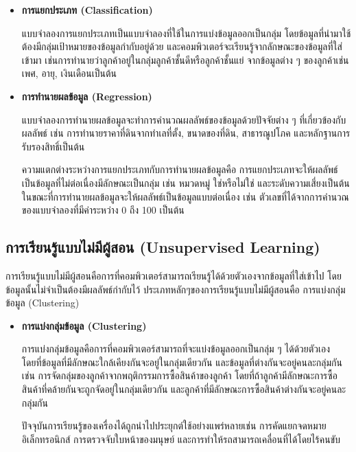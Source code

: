 \begin{itemize}
    \item\textbf{การแยกประเภท (Classification)}\par
    แบบจำลองการแยกประเภทเป็นแบบจำลองที่ใช้ในการแบ่งข้อมูลออกเป็นกลุ่ม 
    โดยข้อมูลที่นำมาใช้ต้องมีกลุ่มเป้าหมายของข้อมูลกำกับอยู่ด้วย 
    และคอมพิวเตอร์จะเรียนรู้จากลักษณะของข้อมูลที่ใส่เข้ามา 
    เช่นการทำนายว่าลูกค้าอยู่ในกลุ่มลูกค้าชั้นดีหรือลูกค้าชั้นแย่ จากข้อมูลต่าง ๆ ของลูกค้าเช่น เพศ, อายุ, เงินเดือนเป็นต้น

    \item\textbf{การทำนายผลข้อมูล (Regression)}\par
    แบบจำลองการทำนายผลข้อมูลจะทำการคำนวณผลลัพธ์ของข้อมูลด้วยปัจจัยต่าง ๆ ที่เกี่ยวข้องกับผลลัพธ์ 
    เช่น การทำนายราคาที่ดินจากทำเลที่ตั้ง, ขนาดของที่ดิน, สาธารณูปโภค 
    และหลักฐานการรับรองสิทธิ์เป็นต้น\par
    ความแตกต่างระหว่างการแยกประเภทกับการทำนายผลข้อมูลคือ 
    การแยกประเภทจะให้ผลลัพธ์เป็นข้อมูลที่ไม่ต่อเนื่องมีลักษณะเป็นกลุ่ม 
    เช่น หมวดหมู่ ใช่หรือไม่ใช่ และระดับความเสี่ยงเป็นต้น ในขณะที่การทำนายผลข้อมูลจะให้ผลลัพธ์เป็นข้อมูลแบบต่อเนื่อง เช่น 
    ตัวเลขที่ได้จากการคำนวณของแบบจำลองที่มีค่าระหว่าง 0 ถึง 100 เป็นต้น
\end{itemize}

\subsection{การเรียนรู้แบบไม่มีผู้สอน (Unsupervised Learning)}
การเรียนรู้แบบไม่มีผู้สอนคือการที่คอมพิวเตอร์สามารถเรียนรู้ได้ด้วยตัวเองจากข้อมูลที่ใส่เข้าไป 
โดยข้อมูลนั้นไม่จำเป็นต้องมีผลลัพธ์กำกับไว้ ประเภทหลักๆของการเรียนรู้แบบไม่มีผู้สอนคือ การแบ่งกลุ่มข้อมูล (Clustering)

\begin{itemize}
    \item\textbf{การแบ่งกลุ่มข้อมูล (Clustering)}\par
    การแบ่งกลุ่มข้อมูลคือการที่คอมพิวเตอร์สามารถที่จะแบ่งข้อมูลออกเป็นกลุ่ม ๆ ได้ด้วยตัวเอง 
    โดยที่ข้อมูลที่มีลักษณะใกล้เคียงกันจะอยู่ในกลุ่มเดียวกัน และข้อมูลที่ต่างกันจะอยู่คนละกลุ่มกัน 
    เช่น การจัดกลุ่มของลูกค้าจากพฤติกรรมการซื้อสินค้าของลูกค้า โดยที่ถ้าลูกค้ามีลักษณะการซื้อสินค้าที่คล้ายกันจะถูกจัดอยู่ในกลุ่มเดียวกัน 
    และลูกค้าที่มีลักษณะการซื้อสินค้าต่างกันจะอยู่คนละกลุ่มกัน\par
    ปัจจุบันการเรียนรู้ของเครื่องได้ถูกนำไปประยุกต์ใช้อย่างแพร่หลายเช่น 
    การคัดแยกจดหมายอิเล็กทรอนิกส์ การตรวจจับใบหน้าของมนุษย์ 
    และการทำให้รถสามารถเคลื่อนที่ได้โดยไร้คนขับ
\end{itemize}




